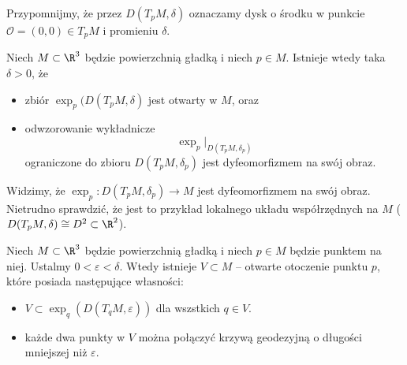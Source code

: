 \begin{frame}
Przypomnijmy, że przez $D(T_pM,\delta)$ oznaczamy dysk o środku w punkcie $\mathcal{O}=(0,0)\in T_pM$ i promieniu $\delta$.


\begin{lemat}
Niech $M\subset \R^3$ będzie powierzchnią gładką i niech $p\in M$. Istnieje wtedy taka $\delta>0$, że 
\begin{itemize} 
\item zbiór $\exp_p(D(T_pM,\delta)$ jest otwarty w $M$, oraz
\pause \item odwzorowanie wykładnicze \[\exp_p\big|_{D(T_pM,\delta_p)}\] ograniczone do zbioru $D(T_pM,\delta_p)$ jest dyfeomorfizmem na swój obraz.
\end{itemize}
\end{lemat}

\pause

\end{frame}
\begin{frame}


\begin{uwaga}
Widzimy, że $\exp_p\colon D(T_pM,\delta_p)\to M$ jest dyfeomorfizmem na swój obraz. Nietrudno sprawdzić, że jest to przykład lokalnego układu współrzędnych na $M$ ($D(T_pM,\delta)\cong D^2\subset \R^2$). 
\end{uwaga}

\pause\begin{wniosek}
Niech $M\subset\R^3$ będzie powierzchnią gładką i niech $p\in M$ będzie punktem na niej. Ustalmy $0<\varepsilon<\delta$. Wtedy istnieje $V\subset M$ -- otwarte otoczenie punktu $p$, które posiada następujące własności:
\begin{itemize}
\item $V\subset \exp_q(D(T_qM,\varepsilon))$ dla wszstkich $q\in V$.
\pause \item każde dwa punkty w $V$ można połączyć krzywą geodezyjną o długości mniejszej niż $\varepsilon$.
\end{itemize}
\end{wniosek}

\end{frame}
